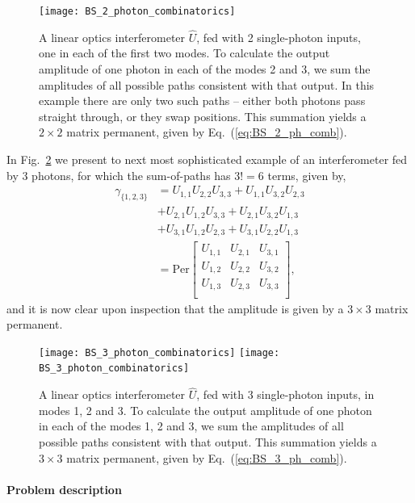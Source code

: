 \begin{figure}[!htbp]
\texttt{[image: BS\_2\_photon\_combinatorics]}
\captionspacefig \caption{A linear optics interferometer $\hat{U}$, fed with 2 single-photon inputs, one in each of the first two modes. To calculate the output amplitude of one photon in each of the modes 2 and 3, we sum the amplitudes of all possible paths consistent with that output. In this example there are only two such paths -- either both photons pass straight through, or they swap positions. This summation yields a \mbox{$2\times 2$} matrix permanent, given by Eq.~(\ref{eq:BS_2_ph_comb}).}\label{fig:BS_2_comb}	
\end{figure}

In Fig.~\ref{fig:BS_3_comb} we present to next most sophisticated example of an interferometer fed by 3 photons, for which the sum-of-paths has \mbox{$3!=6$} terms, given by,
\begin{align} \label{eq:BS_3_ph_comb}
\gamma_{\{1,2,3\}} &= U_{1,1}U_{2,2}U_{3,3} + U_{1,1}U_{3,2}U_{2,3} \nonumber \\
&+ U_{2,1}U_{1,2}U_{3,3} + U_{2,1}U_{3,2}U_{1,3} \nonumber \\
&+ U_{3,1}U_{1,2}U_{2,3} + U_{3,1}U_{2,2}U_{1,3}
\nonumber \\
&= \mathrm{Per} \left[ {\begin{array}{ccc}
   U_{1,1} & U_{2,1} & U_{3,1} \\
   U_{1,2} & U_{2,2} & U_{3,2} \\
   U_{1,3} & U_{2,3} & U_{3,3} \\
  \end{array} } \right],
\end{align}
and it is now clear upon inspection that the amplitude is given by a \mbox{$3\times 3$} matrix permanent.

\begin{figure}[!htbp]
\pubmode
	\texttt{[image: BS\_3\_photon\_combinatorics]}
\else
	\texttt{[image: BS\_3\_photon\_combinatorics]}
\fi
\captionspacefig \caption{A linear optics interferometer $\hat{U}$, fed with 3 single-photon inputs, in modes 1, 2 and 3. To calculate the output amplitude of one photon in each of the modes 1, 2 and 3, we sum the amplitudes of all possible paths consistent with that output. This summation yields a \mbox{$3\times 3$} matrix permanent, given by Eq.~(\ref{eq:BS_3_ph_comb}).}\label{fig:BS_3_comb}	
\end{figure}

\paragraph{Problem description}

